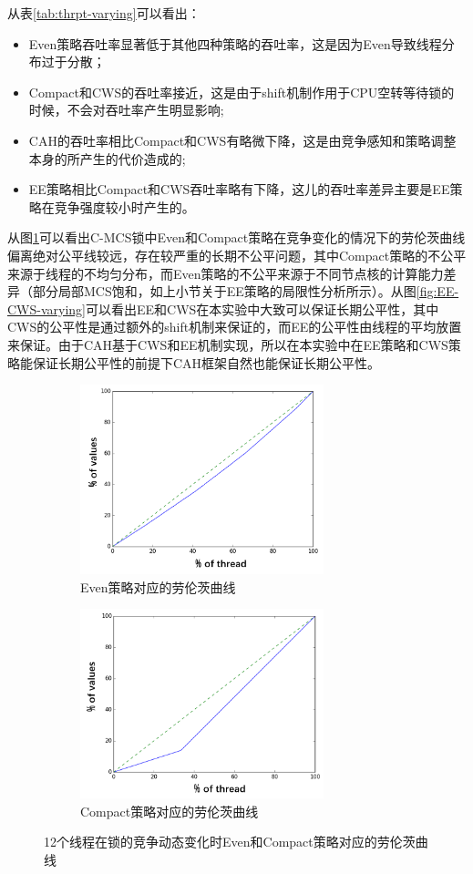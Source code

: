 从表\ref{tab:thrpt-varying}可以看出：
\begin{itemize}
\item Even策略吞吐率显著低于其他四种策略的吞吐率，这是因为Even导致线程分布过于分散；
\item Compact和CWS的吞吐率接近，这是由于shift机制作用于CPU空转等待锁的时候，不会对吞吐率产生明显影响;
\item CAH的吞吐率相比Compact和CWS有略微下降，这是由竞争感知和策略调整本身的所产生的代价造成的;
\item EE策略相比Compact和CWS吞吐率略有下降，这儿的吞吐率差异主要是EE策略在竞争强度较小时产生的。
\end{itemize}

从图\ref{fig:compact-even-varying}可以看出C-MCS锁中Even和Compact策略在竞争变化的情况下的劳伦茨曲线偏离绝对公平线较远，存在较严重的长期不公平问题，其中Compact策略的不公平来源于线程的不均匀分布，而Even策略的不公平来源于不同节点核的计算能力差异（部分局部MCS饱和，如上小节关于EE策略的局限性分析所示）。从图\ref{fig:EE-CWS-varying}可以看出EE和CWS在本实验中大致可以保证长期公平性，其中CWS的公平性是通过额外的shift机制来保证的，而EE的公平性由线程的平均放置来保证。由于CAH基于CWS和EE机制实现，所以在本实验中在EE策略和CWS策略能保证长期公平性的前提下CAH框架自然也能保证长期公平性。

\begin{figure}[!htp]
  \centering
  \begin{subfigure}{8.0cm}
    \centering
    \includegraphics[height=5.5cm]{figure/even-varying.png}
    \caption{Even策略对应的劳伦茨曲线}
  \end{subfigure}
  \hspace{1em}
  \begin{subfigure}{6.0cm}
    \centering
    \includegraphics[height=5.5cm]{figure/compact-varying.png}
    \caption{Compact策略对应的劳伦茨曲线}
  \end{subfigure}
  \caption{12个线程在锁的竞争动态变化时Even和Compact策略对应的劳伦茨曲线}
  \label{fig:compact-even-varying}
\end{figure}


